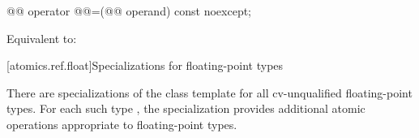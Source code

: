 %
%
%
%
%
\begin{itemdecl}
@@ operator @@=(@@ operand) const noexcept;
\end{itemdecl}

\begin{itemdescr}
\pnum
\effects
Equivalent to:
\end{itemdescr}

[atomics.ref.float]{Specializations for floating-point types}

\pnum
{}%
There are specializations of the  class template
for all cv-unqualified floating-point types.
For each such type ,
the specialization  provides
additional atomic operations appropriate to floating-point types.

